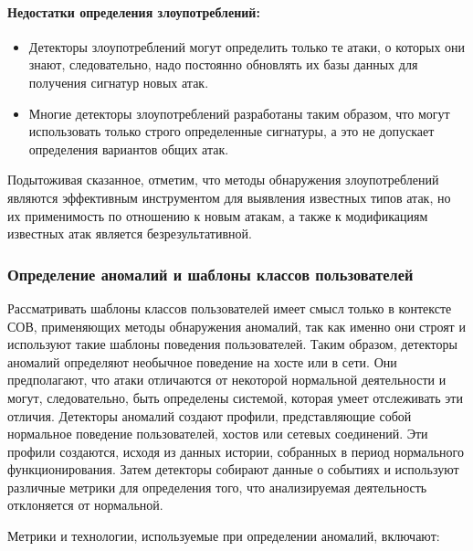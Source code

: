\paragraph*{Недостатки определения злоупотреблений:}

\begin{itemize}
	\item Детекторы злоупотреблений могут определить только те атаки, о которых они знают, следовательно, надо постоянно обновлять их базы данных для получения сигнатур новых атак.

	\item Многие детекторы злоупотреблений разработаны таким образом, что могут использовать только строго определенные сигнатуры, а это не допускает определения вариантов общих атак.
\end{itemize}

Подытоживая сказанное, отметим, что методы обнаружения злоупотреблений являются эффективным инструментом для выявления известных типов атак, но их применимость по отношению к новым атакам,
а также к модификациям известных атак является безрезультативной.


\subsubsection{Определение аномалий и шаблоны классов пользователей}

Рассматривать шаблоны классов пользователей имеет смысл только в контексте СОВ,
применяющих методы обнаружения аномалий, так как именно они строят и используют
такие шаблоны поведения пользователей. Таким образом, детекторы аномалий определяют
необычное поведение на хосте или в сети. Они предполагают, что атаки отличаются от
некоторой нормальной деятельности и могут, следовательно, быть определены системой,
которая умеет отслеживать эти отличия. Детекторы аномалий создают профили, представляющие
собой нормальное поведение пользователей, хостов или сетевых соединений. Эти профили
создаются, исходя из данных истории, собранных в период нормального функционирования.
Затем детекторы собирают данные о событиях и используют различные метрики для определения
того, что анализируемая деятельность отклоняется от нормальной.

Метрики и технологии, используемые при определении аномалий, включают:

